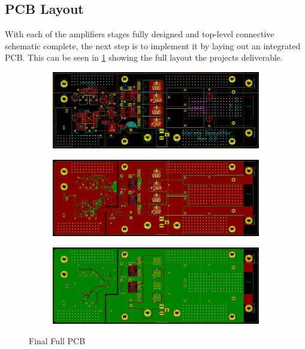 \documentclass[11pt]{article}
\begin{document}
{\subsection{PCB Layout}

With each of the amplifiers stages fully designed and top-level connective schematic complete, the next step is to implement it by laying out an integrated PCB. This can be seen in \cref{F:PCB} showing the full layout the projects deliverable.

\begin{figure}[h!]
  \centering
  \begin{subfigure}{0.45\textwidth}
    \includegraphics[width=\columnwidth]{img/traces.png}
  \end{subfigure}
  \begin{subfigure}{0.45\textwidth}
    \includegraphics[width=\columnwidth]{img/top_layer.png}
  \end{subfigure}
  \begin{subfigure}{0.45\textwidth}
    \includegraphics[width=\columnwidth]{img/bottom_layer.png}
  \end{subfigure}
  \caption{Final Full PCB}
  \label{F:PCB}
\end{figure}

}
\end{document}
